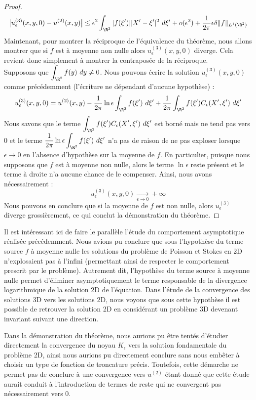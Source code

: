 \begin{proof}
$$ \big| u^{(3)}_{\epsilon}(x,y,0) - u^{(2)}(x,y) \big| \leq \epsilon^2 \int_{\R^2} |f(\xi')| |X' - \xi'|^2 \ d\xi' + o(\epsilon^2) + \frac{1}{2\pi}\epsilon \delta \|f\|_{L^1(\R^2)} $$
Maintenant, pour montrer la réciproque de l'équivalence du théorème, nous allons montrer que si $f$ est à moyenne non nulle alors $u^{(3)}_{\epsilon}(x,y,0)$ diverge. Cela revient donc simplement à montrer la contraposée de la réciproque. \\ 
Supposons que $\displaystyle \int_{\R^2} f(y) \ dy \neq 0$. Nous pouvons écrire la solution $u^{(3)}_{\epsilon}(x,y,0)$ comme précédemment (l'écriture ne dépendant d'aucune hypothèse) : 
$$ u^{(3)}_{\epsilon}(x,y,0) = u^{(2)}(x,y) - \frac{1}{2\pi}\ln \epsilon \int_{\R^2} f(\xi') \ d\xi' + \frac{1}{2\pi} \int_{\R^2} f(\xi') C_{\epsilon}(X',\xi') \ d\xi' $$
Nous savons que le terme $\displaystyle \int_{\R^2} f(\xi')C_{\epsilon}(X',\xi') \ d\xi'$ est borné mais ne tend pas vers 0 et le terme $\displaystyle \frac{1}{2\pi} \ln \epsilon \int_{\R^2} f(\xi') \ d\xi' $ n'a pas de raison de ne pas exploser lorsque $\epsilon \to 0$ en l'absence d'hypothèse sur la moyenne de $f$. En particulier, puisque nous supposons que $f$ est à moyenne non nulle, alors le terme $\ln \epsilon$ reste présent et le terme à droite n'a aucune chance de le compenser.
Ainsi, nous avons nécessairement :
$$ u^{(3)}_{\epsilon}(x,y,0) \xrightarrow[\epsilon \to 0]{} + \infty$$
Nous pouvons en conclure que si la moyenne de $f$ est non nulle, alors $u_{\epsilon}^{(3)}$ diverge grossièrement, ce qui conclut la démonstration du théorème.
\end{proof}
Il est intéressant ici de faire le parallèle l'étude du comportement asymptotique réalisée précédemment. Nous avions pu conclure que sous l'hypothèse du terme source $f$ à moyenne nulle les solutions du problème de Poisson et Stokes en 2D n'explosaient pas à l'infini (permettant ainsi de respecter le comportement prescrit par le problème). Autrement dit, l'hypothèse du terme source à moyenne nulle 
permet d'éliminer asymptotiquement le terme responsable de la divergence logarithmique de la solution 2D de l'équation. Dans l'étude de la convergence des solutions 3D vers les solutions 2D, nous voyons que sous cette hypothèse il est possible de retrouver la solution 2D en considérant un problème 3D devenant invariant suivant une direction.

\begin{remarkbox}
    \begin{remark}
        Dans la démonstration du théorème, nous aurions pu être tentés d'étudier directement la convergence du noyau $K_{\epsilon}$ vers la solution fondamentale du problème 2D, ainsi nous aurions pu directement conclure sans
        nous embêter à choisir un type de fonction de troncature précis. Toutefois, cette démarche ne permet pas de conclure à une convergence vers $u^{(2)}$ étant donné que cette étude aurait conduit à l'introduction de termes de reste qui ne convergent pas nécessairement vers 0.
    \end{remark}
\end{remarkbox}






